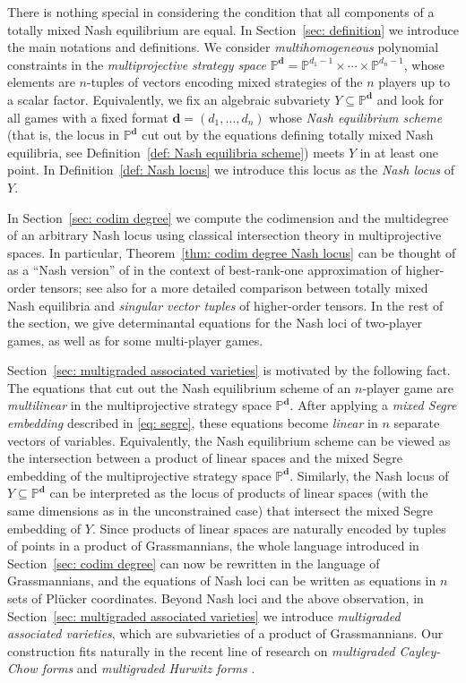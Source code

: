 \documentclass[12pt]{article}
\theoremstyle{definition}
\newcommand{\PP}{{\mathbb P}}
\def\bd{{\boldsymbol{d}}}
\begin{document}
\medskip

There is nothing special in considering the condition that all components of a totally mixed Nash equilibrium are equal.
In Section~\ref{sec: definition} we introduce the main notations and definitions. We consider {\em multihomogeneous} polynomial constraints in the {\em multiprojective strategy space} $\PP^\bd=\PP^{d_1-1}\times\cdots\times\PP^{d_n-1}$, whose elements are $n$-tuples of vectors encoding mixed strategies of the $n$ players up to a scalar factor. Equivalently, we fix an algebraic subvariety $Y\subseteq\PP^\bd$ and look for all games with a fixed format $\bd=(d_1,\ldots,d_n)$ whose {\em Nash equilibrium scheme} (that is, the locus in $\PP^\bd$ cut out by the equations defining totally mixed Nash equilibria, see Definition~\ref{def: Nash equilibria scheme}) meets $Y$ in at least one point. In Definition~\ref{def: Nash locus} we introduce this locus as the {\em Nash locus} of $Y$.

\medskip

In Section~\ref{sec: codim degree} we compute the codimension and the multidegree of an arbitrary Nash locus using classical intersection theory in multiprojective spaces. In particular, Theorem~\ref{thm: codim degree Nash locus} can be thought of as a ``Nash version'' of \cite[Theorem 1]{shahidi2021degrees} in the context of best-rank-one approximation of higher-order tensors; see also \cite[Section 2.4]{abo2026vector} for a more detailed comparison between totally mixed Nash equilibria and {\em singular vector tuples} of higher-order tensors. In the rest of the section, we give determinantal equations for the Nash loci of two-player games, as well as for some multi-player games.

\medskip

Section~\ref{sec: multigraded associated varieties} is motivated by the following fact. The equations that cut out the Nash equilibrium scheme of an $n$-player game are {\em multilinear} in the multiprojective strategy space $\PP^\bd$. After applying a {\em mixed Segre embedding} described in \eqref{eq: segre}, these equations become {\em linear} in $n$ separate vectors of variables. Equivalently, the Nash equilibrium scheme can be viewed as the intersection between a product of linear spaces and the mixed Segre embedding of the multiprojective strategy space $\PP^\bd$. Similarly, the Nash locus of $Y\subseteq\PP^\bd$ can be interpreted as the locus of products of linear spaces (with the same dimensions as in the unconstrained case) that intersect the mixed Segre embedding of $Y$. Since products of linear spaces are naturally encoded by tuples of points in a product of Grassmannians, the whole language introduced in Section~\ref{sec: codim degree} can now be rewritten in the language of Grassmannians, and the equations of Nash loci can be written as equations in $n$ sets of Pl\"ucker coordinates. Beyond Nash loci and the above observation, in Section~\ref{sec: multigraded associated varieties} we introduce {\em multigraded associated varieties}, which are subvarieties of a product of Grassmannians. Our construction fits naturally in the recent line of research on {\em multigraded Cayley-Chow forms} \cite{osserman2019multigraded} and {\em multigraded Hurwitz forms} \cite{pratt2026multigraded}.
\end{document}

